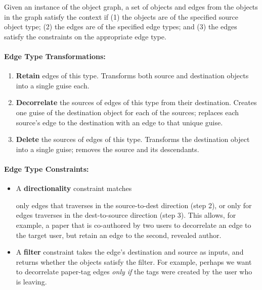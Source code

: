 \noindent Given an instance of the object graph, a set of objects and edges from the objects in the graph
satisfy the context if (1) the objects are of the specified source object type; (2) the edges are of
the specified edge types; and (3) the edges satisfy the constraints on the appropriate edge type.

\paragraph{Edge Type Transformations:}
\begin{enumerate}[nosep]
    \item \textbf{Retain} edges of this type.
    Transforms both source and destination objects into a single guise each.
    \item \textbf{Decorrelate} the sources of edges of this type from their destination.
    Creates one guise of the destination object for each of the sources; replaces each source's
    edge to the destination with an edge to that unique guise.
    \item \textbf{Delete} the sources of edges of this type.
    Transforms the destination object into a single guise; removes the source and its descendants.
\end{enumerate}

\paragraph{Edge Type Constraints:}
\begin{itemize}[nosep]
    \item A \textbf{directionality} constraint matches 
        
        only edges that traverses
    in the source-to-dest direction (step 2), or only for edges \sys traverses in the dest-to-source
    direction (step 3). This allows, for example, a paper that is co-authored by two users to
    decorrelate an edge to the target user, but retain an edge to the second, revealed author.

\item A \textbf{filter} constraint takes the edge's destination and source as inputs, and returns whether the objects satisfy the
    filter. 
    For example, perhaps we want to decorrelate paper-tag edges
    \emph{only if} the tags were created by the user who is leaving.
\end{itemize}


